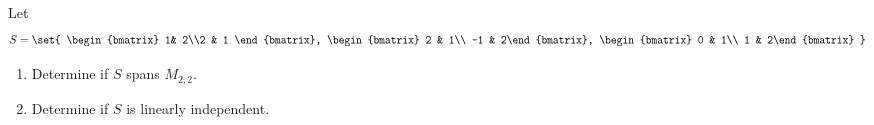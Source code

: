 Let 
\begin{equation*}
S = \set{
\begin{bmatrix} 1& 2\\2 & 1 \end{bmatrix}, 
\begin{bmatrix} 2 & 1\\ -1 & 2\end{bmatrix}, 
\begin{bmatrix} 0 & 1\\ 1 & 2\end{bmatrix} 
}
\end{equation*}
\begin{enumerate}
\item Determine if $S$ spans $M_{2,2}$.
\item Determine if $S$ is linearly independent.
\end{enumerate}
